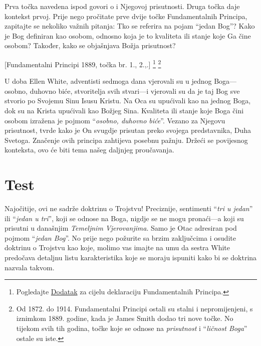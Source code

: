 Prva točka navedena ispod govori o  i Njegovoj prisutnosti. Druga točka daje kontekst prvoj. Prije nego pročitate prve dvije točke Fundamentalnih Principa, zapitajte se nekoliko važnih pitanja: Tko se referira na pojam “jedan Bog”? Kako je Bog definiran kao osobom, odnosno koja je to kvaliteta ili stanje koje Ga čine osobom? Također, kako se objašnjava Božja prisutnost?


[Fundamentalni Principi 1889, točka br. 1., 2.,.] \footnote{Pogledajte \hyperref[chap:appendix]{Dodatak} za cijelu deklaraciju Fundamentalnih Principa.} \footnote{Od 1872. do 1914. Fundamentalni Principi ostali su stalni i nepromijenjeni, s iznimkom 1889. godine, kada je James Smith dodao tri nove točke. No tijekom svih tih godina, točke koje se odnose na \textit{prisutnost} i “\textit{ličnost Boga}” ostale su iste.}

U doba Ellen White, adventisti sedmoga dana vjerovali su u jednog Boga—osobno, duhovno biće, stvoritelja svih stvari—i vjerovali su da je taj Bog sve stvorio po Svojemu Sinu Isusu Kristu. Na Oca su upućivali kao na jednog Boga, dok su na Krista upućivali kao Božjeg Sina. Kvaliteta ili stanje koje Boga čini osobom izražena je pojmom “\textit{osobno, duhovno biće}”. Vezano za Njegovu prisutnost,  tvrde kako je On svugdje prisutan preko svojega predstavnika, Duha Svetoga. Značenje ovih principa zahtijeva posebnu pažnju. Držeći se povijesnog konteksta, ovo će biti tema našeg daljnjeg proučavanja.

\section*{Test}

Najočitije, ovi  ne sadrže doktrinu o Trojstvu! Preciznije, sentimenti “\textit{tri u jedan}” ili “\textit{jedan u tri}”, koji se odnose na Boga, nigdje se ne mogu pronaći—a koji su prisutni u današnjim \textit{Temeljnim Vjerovanjima}. Samo je Otac adresiran pod pojmom “\textit{jedan Bog}”. No prije nego požurite sa brzim zaključcima i osudite doktrinu o Trojstvu kao koje, molimo vas imajte na umu da sestra White predočava detaljnu listu karakteristika koje se moraju ispuniti kako bi se doktrina nazvala takvom.

